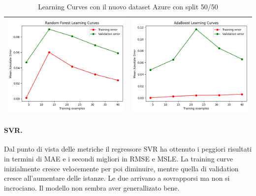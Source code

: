 \begin{table}[H]
\begin{tabularx}{\textwidth}{|X|X|}
        \includegraphics[width=\linewidth, trim=0 0 0 0]{images/RandomForest_lc50_Azure.png} &
        \includegraphics[width=\linewidth, trim=0 0 0 0]{images/AdaBoost_lc50_Azure.png} \\
        \hline
    \end{tabularx}
    \caption{Learning Curves con il nuovo dataset Azure con split 50/50}
    \label{tab:emissions_info}
\end{table}

\paragraph{\textbf{SVR}.}
Dal punto di vista delle metriche il regressore SVR ha ottenuto i peggiori risultati in termini di MAE e i secondi migliori in RMSE e MSLE. La training curve inizialmente cresce velocemente per poi diminuire, mentre quella di validation cresce all'aumentare delle istanze. Le due arrivano a sovrapporsi ma non si incrociano. Il modello non sembra aver generallizato bene.

